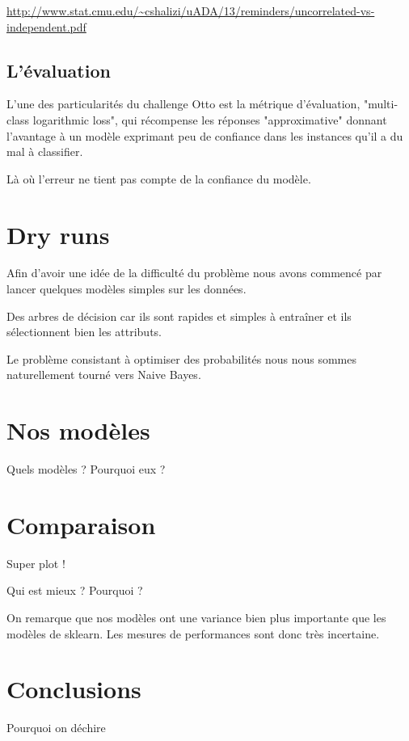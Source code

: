 \documentclass[a4paper, 10pt, twocolomn]{article} %
\begin{document}
\url{http://www.stat.cmu.edu/~cshalizi/uADA/13/reminders/uncorrelated-vs-independent.pdf}

\clearpage

\subsection{L'évaluation} %
\label{sub:l_valuation}

L'une des particularités du challenge Otto est la métrique d'évaluation,
"multi-class logarithmic loss", qui récompense les réponses "approximative"
donnant l'avantage à un modèle exprimant peu de confiance dans les instances 
qu'il a du mal à classifier. 

Là où l'erreur ne tient pas compte de la confiance du modèle.



\section{Dry runs} %
\label{sec:dry_runs}

Afin d'avoir une idée de la difficulté du problème nous avons commencé par
lancer quelques modèles simples sur les données.

\todo Des arbres de décision car ils sont rapides et simples à entraîner et ils
sélectionnent bien les attributs.


\todo Le problème consistant à optimiser des probabilités nous nous sommes
naturellement tourné vers Naive Bayes. 




\section{Nos modèles} %
\label{sec:nos_mod_les}

\todo Quels modèles ? Pourquoi eux ?


\section{Comparaison} %
\label{sec:comparaison}

\todo Super plot !

\todo Qui est mieux ? Pourquoi ?

On remarque que nos modèles ont une variance bien plus importante que 
les modèles de sklearn. Les mesures de performances sont donc très incertaine.


\section*{Conclusions} %
\label{sec:conclusions}

\todo Pourquoi on déchire

\end{document}
